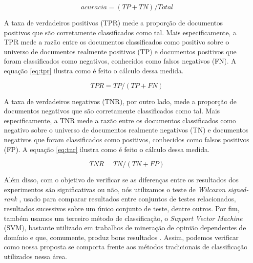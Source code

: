 \begin{equation}
acuracia =  (TP + TN) / Total
\label{eq:acccuracy}
\end{equation}


A taxa de verdadeiros positivos (TPR) mede a proporção de documentos positivos que são corretamente classificados como tal. Mais especificamente, a TPR mede a razão entre os documentos classificados como positivo sobre o universo de documentos realmente positivos (TP) e documentos positivos que foram classificados como negativos, conhecidos como falsos negativos (FN). A equação \ref{eq:tpr} ilustra como é feito o cálculo dessa medida. 

\begin{equation}
TPR = TP / (TP + FN)
\label{eq:tpr}
\end{equation}

A taxa de verdadeiros negativos (TNR), por outro lado, mede a proporção de documentos negativos que são corretamente classificados como tal. Mais especificamente, a TNR mede a razão entre os documentos classificados como negativo sobre o universo de documentos realmente negativos (TN) e documentos negativos que foram classificados como positivos, conhecidos como falsos positivos (FP). A equação \ref{eq:tnr} ilustra como é feito o cálculo dessa medida. 

\begin{equation}
TNR = TN / (TN + FP)
\label{eq:tnr}
\end{equation}


Além disso, com o objetivo de verificar se as diferenças entre os resultados dos experimentos são significativas ou não, nós utilizamos o teste de \textit{Wilcoxon signed-rank} \cite{wilcoxon1945individual}, usado para comparar resultados entre conjuntos de testes relacionados, resultados sucessivos sobre um único conjunto de teste, dentre outros. Por fim, também usamos um terceiro método de classificação, o \textit{Support Vector Machine} (SVM), bastante utilizado em trabalhos de mineração de opinião dependentes de domínio e que, comumente, produz bons resultados \cite{ohana2009sentiment, moraes2012document}. Assim, podemos verificar como nossa proposta se comporta frente aos métodos tradicionais de classificação utilizados nessa área. 

